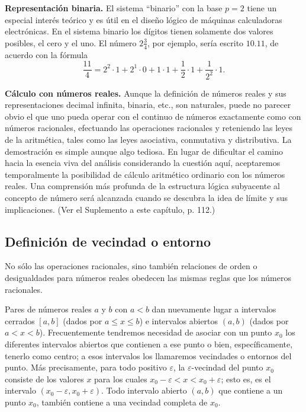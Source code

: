 \documentclass[12pt]{book}
\theoremstyle{definition}
\begin{document}
\textbf{Representación binaria.} El sistema ``binario'' con la base $p = 2$ tiene un especial interés teórico y es útil en el diseño lógico de máquinas calculadoras electrónicas. En el sistema binario los dígitos tienen solamente dos valores posibles, el cero y el uno. El número $2\frac{3}{4}$, por ejemplo, sería escrito $10.11$, de acuerdo con la fórmula
\[
\frac{11}{4} = 2^2 \cdot 1 + 2^1 \cdot 0 + 1 \cdot 1 + \frac{1}{2} \cdot 1 + \frac{1}{2^2} \cdot 1.
\]

\textbf{Cálculo con números reales.} Aunque la definición de números reales y sus representaciones decimal infinita, binaria, etc., son naturales, puede no parecer obvio el que uno pueda operar con el continuo de números exactamente como con números racionales, efectuando las operaciones racionales y reteniendo las leyes de la aritmética, tales como las leyes asociativa, conmutativa y distributiva. La demostración es simple aunque algo tediosa. En lugar de dificultar el camino hacia la esencia viva del análisis considerando la cuestión aquí, aceptaremos temporalmente la posibilidad de cálculo aritmético ordinario con los números reales. Una comprensión más profunda de la estructura lógica subyacente al concepto de número será alcanzada cuando se descubra la idea de límite y sus implicaciones. (Ver el Suplemento a este capítulo, p. 112.)

\subsection{Definición de vecindad o entorno}

No sólo las operaciones racionales, sino también relaciones de orden o desigualdades para números reales obedecen las mismas reglas que los números racionales.

Pares de números reales $a$ y $b$ con $a < b$ dan nuevamente lugar a intervalos cerrados $[a, b]$ (dados por $a \le x \le b$) e intervalos abiertos $(a, b)$ (dados por $a < x < b$). Frecuentemente tendremos necesidad de asociar con un punto $x_0$ los diferentes intervalos abiertos que contienen a ese punto o bien, específicamente, tenerlo como centro; a esos intervalos los llamaremos vecindades o entornos del punto. Más precisamente, para todo positivo $\varepsilon$, la $\varepsilon$-vecindad del punto $x_0$ consiste de los valores $x$ para los cuales $x_0 - \varepsilon < x < x_0 + \varepsilon$; esto es, es el intervalo $(x_0 - \varepsilon, x_0 + \varepsilon)$. Todo intervalo abierto $(a, b)$ que contiene a un punto $x_0$, también contiene a una vecindad completa de $x_0$.
\end{document}

